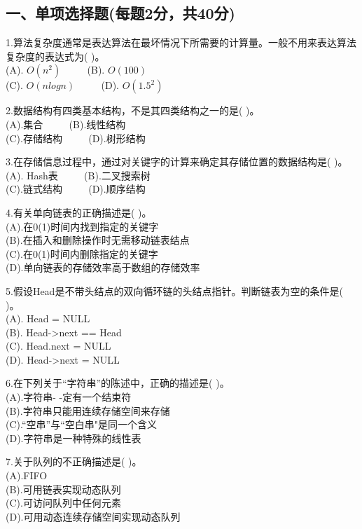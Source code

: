 

\subsection{一、单项选择题(每题2分，共40分)}
1.算法复杂度通常是表达算法在最坏情况下所需要的计算量。一般不用来表达算法复杂度的表达式为( )。 \\
(A). $O(n^2)$  $\qquad$ (B). $O(100)$ \\
(C). $O(nlogn)$ $\qquad$ (D). $O(1.5^2)$

2.数据结构有四类基本结构，不是其四类结构之一的是( )。 \\
(A).集合 $\qquad$ (B).线性结构 \\
(C).存储结构 $\qquad$ (D).树形结构

3.在存储信息过程中，通过对关键字的计算来确定其存储位置的数据结构是( )。 \\
(A). Hash表  $\qquad$  (B).二叉搜索树  \\
(C).链式结构  $\qquad$  (D).顺序结构

4.有关单向链表的正确描述是( )。 \\
(A).在0(1)时间内找到指定的关键字 \\
(B).在插入和删除操作时无需移动链表结点 \\
(C).在0(1)时间内删除指定的关键字 \\
(D).单向链表的存储效率高于数组的存储效率

5.假设Head是不带头结点的双向循环链的头结点指针。判断链表为空的条件是( )。 \\
(A). Head = NULL  \\
(B). Head->next == Head  \\
(C). Head.next = NULL  \\
(D). Head->next = NULL

6.在下列关于“字符串”的陈述中，正确的描述是( )。 \\
(A).字符串- -定有一个结束符 \\
(B).字符串只能用连续存储空间来存储 \\
(C).“空串”与“空白串"是同一个含义 \\
(D).字符串是一种特殊的线性表

7.关于队列的不正确描述是( )。 \\
(A).FIFO \\
(B).可用链表实现动态队列 \\
(C).可访问队列中任何元素 \\
(D).可用动态连续存储空间实现动态队列

